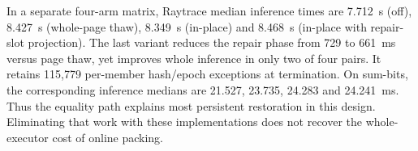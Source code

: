 In a separate four-arm matrix, Raytrace median inference times are 7.712~s (off), 8.427~s (whole-page thaw), 8.349~s (in-place) and 8.468~s (in-place with repair-slot projection). The last variant reduces the repair phase from 729 to 661~ms versus page thaw, yet improves whole inference in only two of four pairs. It retains 115,779 per-member hash/epoch exceptions at termination. On sum-bits, the corresponding inference medians are 21.527, 23.735, 24.283 and 24.241~ms. Thus the equality path explains most persistent restoration in this design. Eliminating that work with these implementations does not recover the whole-executor cost of online packing.
